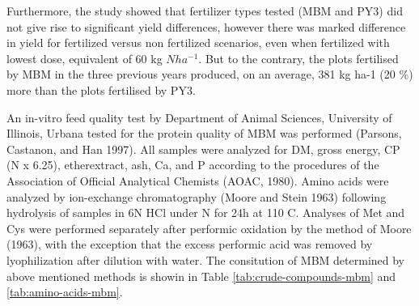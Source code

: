 \documentclass[
]{article}
\begin{document}
Furthermore, the study showed that fertilizer types tested (MBM and PY3) did not give rise to significant yield differences, however there was marked difference in yield for fertilized versus non fertilized scenarios, even when fertilized with lowest dose, equivalent of 60 kg \(N ha^{-1}\). But to the contrary, the plots fertilised by MBM in the three previous years produced, on an average, 381 kg ha-1 (20 \%) more than the plots fertilised by PY3.

An in-vitro feed quality test by Department of Animal Sciences, University of Illinois, Urbana tested for the protein quality of MBM was performed (Parsons, Castanon, and Han 1997). All samples were analyzed for DM, gross energy, CP (N x 6.25), etherextract, ash, Ca, and P according to the procedures of the Association of Official Analytical Chemists (AOAC, 1980). Amino acids were analyzed by ion-exchange chromatography (Moore and Stein 1963) following hydrolysis of samples in 6N HCl under N for 24h at 110 C. Analyses of Met and Cys were performed separately after performic oxidation by the method of Moore (1963), with the exception that the excess performic acid was removed by lyophilization after dilution with water. The consitution of MBM determined by above mentioned methods is showin in Table \ref{tab:crude-compounds-mbm} and \ref{tab:amino-acids-mbm}.
\end{document}
